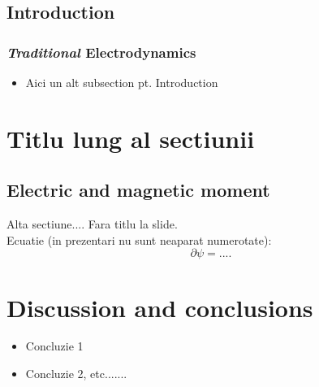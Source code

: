 \documentclass[a4,compress]{beamer}
\begin{document}
\subsection{Introduction}

\begin{frame}
  \frametitle{{\it Traditional} Electrodynamics}
\begin{itemize}
\item Aici un alt subsection pt. Introduction
\end{itemize}

\end{frame}



\section[Titlu scurt]{Titlu lung al sectiunii}
\subsection{Electric and magnetic moment}
\begin{frame}
 Alta sectiune.... Fara titlu la slide. \\
\pause
Ecuatie (in prezentari nu sunt neaparat numerotate):
\begin{equation*} %
\partial \psi = ....
\end{equation*}

\end{frame}



\section[Conclusion]{Discussion and conclusions}
\begin{frame}

\begin{itemize}
	\item Concluzie 1
	\item Concluzie 2, etc.......
\end{itemize}

\end{frame}
\end{document}
